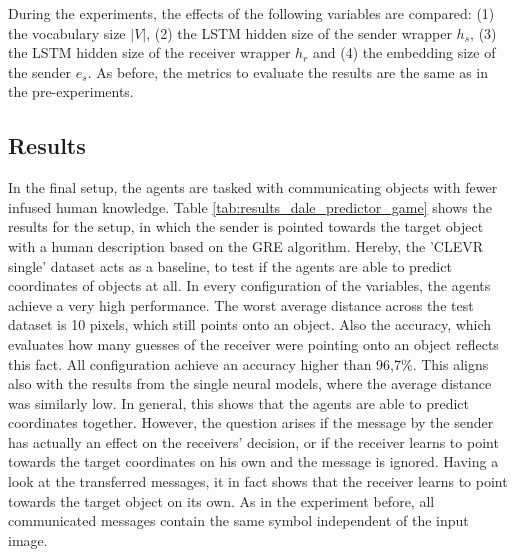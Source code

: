 During the experiments, the effects of the following variables are compared:
(1) the vocabulary size $|V|$,
(2) the LSTM hidden size of the sender wrapper $h_s$,
(3) the LSTM hidden size of the receiver wrapper $h_r$ and
(4) the embedding size of the sender $e_s$.
As before, the metrics to evaluate the results are the same as in the pre-experiments.

\subsection*{Results}
In the final setup, the agents are tasked with communicating objects with fewer infused human knowledge.
Table \ref{tab:results_dale_predictor_game} shows the results for the setup, in which the sender is pointed towards the target object with a human description based on the GRE algorithm.
Hereby, the 'CLEVR single' dataset acts as a baseline, to test if the agents are able to predict coordinates of objects at all.
In every configuration of the variables, the agents achieve a very high performance.
The worst average distance across the test dataset is 10 pixels, which still points onto an object.
Also the accuracy, which evaluates how many guesses of the receiver were pointing onto an object reflects this fact.
All configuration achieve an accuracy higher than 96,7\%.
This aligns also with the results from the single neural models, where the average distance was similarly low.
In general, this shows that the agents are able to predict coordinates together.
However, the question arises if the message by the sender has actually an effect on the receivers' decision, or if the receiver learns to point towards the target coordinates on his own and the message is ignored.
Having a look at the transferred messages, it in fact shows that the receiver learns to point towards the target object on its own.
As in the experiment before, all communicated messages contain the same symbol independent of the input image.

